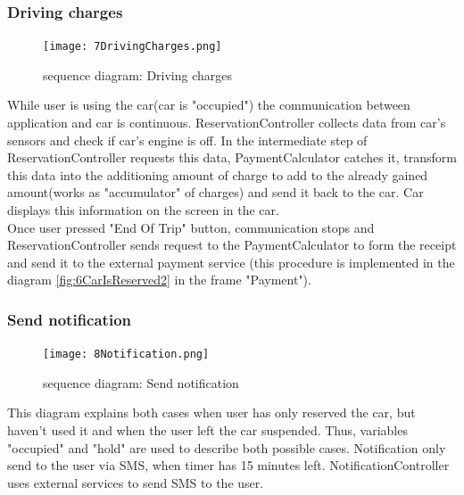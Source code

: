\documentclass[12pt, letterpaper]{article}
\begin{document}
\subsubsection{Driving charges}
\begin{figure}[H]
\centering
\texttt{[image: 7DrivingCharges.png]} 
\caption{sequence diagram: Driving charges}
\label{fig:7DrivingCharges}
\end{figure}
\newpage

While user is using the car(car is "occupied") the communication between application and car is continuous. ReservationController collects data from car's sensors and check if car's engine is off. In the intermediate step of ReservationController requests this data, PaymentCalculator catches it, transform this data into the additioning amount of charge to add to the already gained amount(works as "accumulator" of charges) and send it back to the car. Car displays this information on the screen in the car. \\
Once user pressed "End Of Trip" button, communication stops and ReservationController sends request to the PaymentCalculator to form the receipt and send it to the external payment service (this procedure is implemented in the diagram \ref{fig:6CarIsReserved2} in the frame "Payment"). 
\newpage

\subsubsection{Send notification}
\begin{figure}[H]
\centering
\texttt{[image: 8Notification.png]} 
\caption{sequence diagram: Send notification}
\label{fig:8Notification}
\end{figure}
\newpage

This diagram explains both cases when user has only reserved the car, but haven't used it and when the user left the car suspended. Thus, variables "occupied" and "hold" are used to describe both possible cases. Notification only send to the user via SMS, when timer has 15 minutes left. NotificationController uses external services to send SMS to the user. 

\newpage
\end{document}
